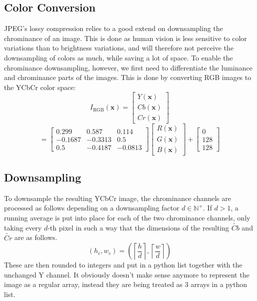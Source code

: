 \subsection{Color Conversion}
\label{sec:color}
JPEG's lossy compression relies to a good extend on downsampling the chrominance of an image. This is done as human vision is less sensitive to color variations than to brightness variations, and will therefore not perceive the downsampling of colors as much, while saving a lot of space.
To enable the chrominance downsampling, however, we first need to differentiate the luminance and chrominance parts of the images. This is done by converting RGB images to the YCbCr color space:
\begin{equation}
I_{\text{RGB}}(\bm{x}) = \begin{bmatrix} Y(\bm{x}) \\ Cb(\bm{x}) \\ Cr(\bm{x}) \end{bmatrix}
\end{equation}
\begin{equation}
= \begin{bmatrix} 0.299 & 0.587 & 0.114 \\ -0.1687 & -0.3313 & 0.5 \\ 0.5 & -0.4187 & -0.0813 \end{bmatrix} \begin{bmatrix} R(\bm{x}) \\ G(\bm{x}) \\ B(\bm{x}) \end{bmatrix} + \begin{bmatrix} 0 \\ 128 \\ 128 \end{bmatrix}
\end{equation}

\subsection{Downsampling}
To downsample the resulting YCbCr image, the chrominance channels are processed as follows depending on a downsampling factor  $d \in \mathbb{N}^+$. 
If \(d > 1\), a running average is put into place for each of the two chrominance channels, only taking every \(d\)-th pixel in such a way that the dimensions of the resulting \(\tilde{Cb}\) and \(\tilde{Cr}\) are as follows. 
\[
(h_c, w_c) = \left( \left\lceil \frac{h}{d} \right\rceil, \left\lceil \frac{w}{d} \right\rceil \right)
\]
These are then rounded to integers and put in a python list together with the unchanged Y channel. It obviously doesn't make sense anymore to represent the image as a regular array, instead they are being treated as 3 arrays in a python list.

